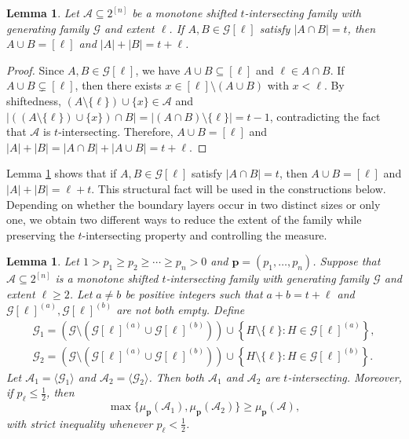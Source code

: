 \documentclass[11pt]{article}
\newtheorem{lemma}[theorem]{Lemma}
\begin{document}
\begin{lemma}\label{le3}
 Let $\mathcal{A}\subseteq 2^{[n]}$ be  a monotone shifted $t$-intersecting family with  generating family  $\mathcal{G}$ and extent $\ell$. If 
$A, B\in \mathcal{G}[\ell]$ satisfy $|A\cap B|=t$, then $A\cup B=[\ell]$ and $|A|+|B|=t+\ell$.
\end{lemma}
\begin{proof}
Since $A, B\in \mathcal{G}[\ell]$, we have $A\cup B\subseteq[\ell]$ and $\ell\in A\cap B$. If $A\cup B\subsetneq[\ell]$, then there exists  $x\in[\ell]\setminus(A\cup B)$ with $x<\ell$. By shiftedness,  $(A\setminus\{\ell\})\cup\{x\}\in\mathcal{A}$ 
and $|((A\setminus\{\ell\})\cup\{x\})\cap B|=|(A\cap B)\setminus\{\ell\}|=t-1$, contradicting the fact that $\mathcal{A}$ is $t$-intersecting. Therefore, $A\cup B=[\ell]$ and $|A|+|B|=|A\cap B|+|A\cup B|=t+\ell$.
\end{proof}

Lemma \ref{le3} shows that if $A,B\in\mathcal{G}[\ell]$ satisfy $|A\cap B|=t$, then $A\cup B=[\ell]$ and $|A|+|B|=\ell+t$. This structural fact will be used in the constructions below. Depending on whether the boundary layers occur in two distinct sizes or only one, we obtain two different ways to reduce the extent of the family while preserving the $t$-intersecting property and controlling the measure.

\begin{lemma}\label{pr1}
Let $1 > p_1 \ge p_2 \ge \cdots \ge p_n > 0$ and $\mathbf{p} = (p_1, \dots, p_n)$.
Suppose that $\mathcal{A}\subseteq 2^{[n]}$ is  a monotone shifted $t$-intersecting family with  generating family  $\mathcal{G}$ and extent $\ell \geq 2$. Let $a\neq b$ be positive integers such that $a+b=t+\ell$ and $\mathcal{G}[\ell]^{(a)},\mathcal{G}[\ell]^{(b)}$ are not both empty. Define 
\begin{align*}
\mathcal{G}_1=\left(\mathcal{G}\setminus\left(\mathcal{G}[\ell]^{(a)}\cup\mathcal{G}[\ell]^{(b)}\right)\right)\cup\left\{H\setminus\{\ell\}: H\in\mathcal{G}[\ell]^{(a)}\right\},\\
\mathcal{G}_2=\left(\mathcal{G}\setminus\left(\mathcal{G}[\ell]^{(a)}\cup\mathcal{G}[\ell]^{(b)}\right)\right)\cup\left\{H\setminus\{\ell\}: H\in\mathcal{G}[\ell]^{(b)}\right\}.
\end{align*}
Let 
$\mathcal{A}_1=\langle\mathcal{G}_1\rangle$ and  $\mathcal{A}_2=\langle\mathcal{G}_2\rangle$.
Then both $\mathcal{A}_1$ and $\mathcal{A}_2$ are $t$-intersecting. Moreover, if $p_{\ell}\leq \frac{1}{2}$, then
$$
\max\{\mu_{\mathbf{p}}(\mathcal{A}_1),\mu_{\mathbf{p}}(\mathcal{A}_2)\}\geq \mu_{\mathbf{p}}(\mathcal{A}),
$$
with strict inequality  whenever $p_{\ell}<\frac{1}{2}$.
\end{lemma}
\end{document}
